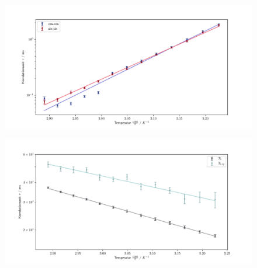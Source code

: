 \begin{figure}[H]
    \centering
    \includegraphics[width=\textwidth]{Auswertung/Tempabh/Korr_Temp.pdf}
    \caption{}
    \label{fig:tempabh}
\end{figure}


\begin{figure}[H]
    \centering
    \includegraphics[width=\textwidth]{Auswertung/Tempabh/T1.pdf}
    \caption{}
    \label{fig:t1t1q}
\end{figure}

